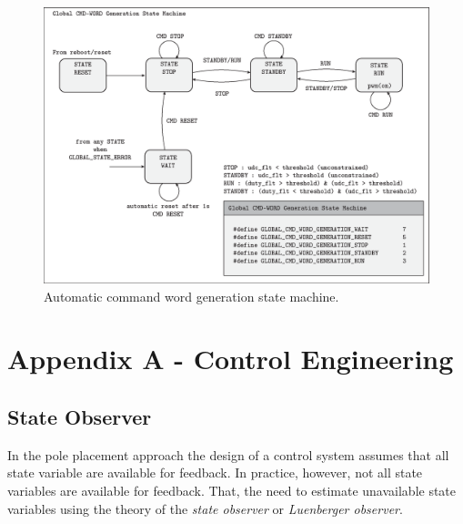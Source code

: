 \documentclass[11pt,a4paper,oneside]{book}
\numberwithin{equation}{section}
\theoremstyle{it}
\theoremstyle{definition}
\begin{document}
\begin{figure}[H]
	\centering
	\includegraphics[width= 450pt, angle = 0, 
	keepaspectratio]{figures/firmware_arch/global_cmd_word_generator_state_machine.eps}
	\captionsetup{width=0.5\textwidth, font=small}	
	\caption{Automatic command word generation state machine.}
	\label{global_cmd_word_generator_state_machine}
\end{figure}

\chapter{Appendix A - Control Engineering}
\section{State Observer}\label{state_observer_theory} 
In the pole placement approach the design of a control system assumes that 
all state variable are available for feedback. In practice, however, not all 
state variables are available for feedback. That, the need to estimate 
unavailable state variables using the theory of the \textit{state observer} or \textit{Luenberger observer}.
\end{document}
